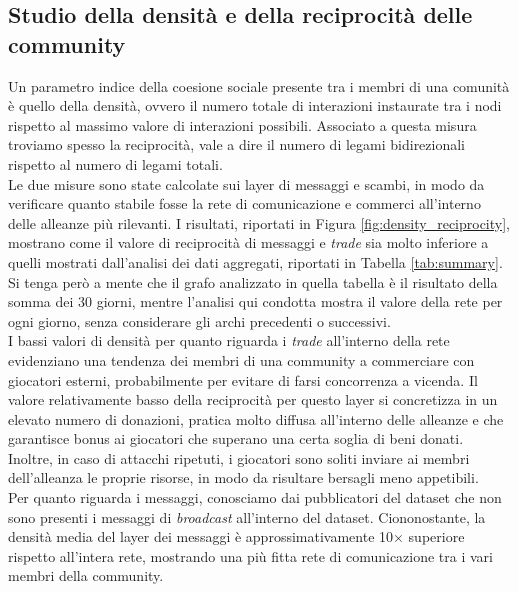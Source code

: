 \subsection{Studio della densità e della reciprocità delle community}
\label{sec:density}
Un parametro indice della coesione sociale presente tra i membri di una comunità è quello della densità, ovvero il numero totale di interazioni instaurate tra i nodi rispetto al massimo valore di interazioni possibili. Associato a questa misura troviamo spesso la reciprocità, vale a dire il numero di legami bidirezionali rispetto al numero di legami totali. \\
Le due misure sono state calcolate sui layer di messaggi e scambi, in modo da verificare quanto stabile fosse la rete di comunicazione e commerci all'interno delle alleanze più rilevanti.
I risultati, riportati in Figura \ref{fig:density_reciprocity}, mostrano come il valore di reciprocità di messaggi e \textit{trade} sia molto inferiore a quelli mostrati dall'analisi dei dati aggregati, riportati in Tabella \ref{tab:summary}. Si tenga però a mente che il grafo analizzato in quella tabella è il risultato della somma dei 30 giorni, mentre l'analisi qui condotta mostra il valore della rete per ogni giorno, senza considerare gli archi precedenti o successivi.\\
I bassi valori di densità per quanto riguarda i \textit{trade} all'interno della rete evidenziano una tendenza dei membri di una community a commerciare con giocatori esterni, probabilmente per evitare di farsi concorrenza a vicenda. Il valore relativamente basso della reciprocità per questo layer si concretizza in un elevato numero di donazioni, pratica molto diffusa all'interno delle alleanze e che garantisce bonus ai giocatori che superano una certa soglia di beni donati. Inoltre, in caso di attacchi ripetuti, i giocatori sono soliti inviare ai membri dell'alleanza le proprie risorse, in modo da risultare bersagli meno appetibili.\\
Per quanto riguarda i messaggi, conosciamo dai pubblicatori del dataset che non sono presenti i messaggi di \textit{broadcast} all'interno del dataset.  Ciononostante, la densità media del layer dei messaggi è approssimativamente 10$\times$ superiore rispetto all'intera rete, mostrando una più fitta rete di comunicazione tra i vari membri della community.\\
